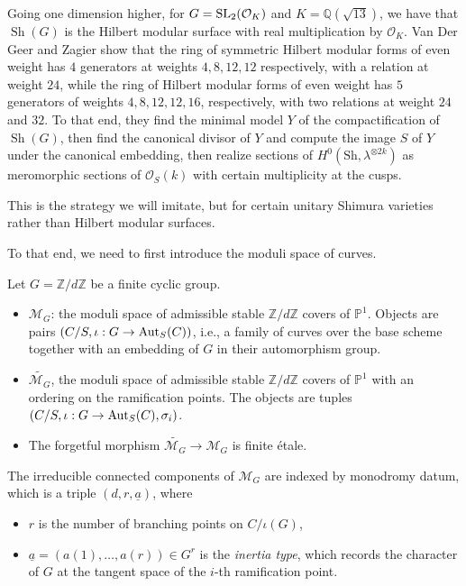 \documentclass[reqno]{amsart} 
\begin{document}
Going one dimension higher, for $G = \operatorname{SL}_2(\mathcal{O}_K)$ and $K = \mathbb{Q}(\sqrt{13})$, we have that $\operatorname{Sh}(G)$ is the Hilbert modular surface with real multiplication by $\mathcal{O}_K$.  Van Der Geer and Zagier show that the ring of symmetric Hilbert modular forms of even weight has $4$ generators at weights $4, 8, 12, 12$ respectively, with a relation at weight $24$, while the ring of Hilbert modular forms of even weight has $5$ generators of weights $4, 8, 12, 12, 16$, respectively, with two relations at weight $24$ and $32$.  To that end, they find the minimal model $Y$ of the compactification of $\operatorname{Sh}(G)$, then find the canonical divisor of $Y$ and compute the image $S$ of $Y$ under the canonical embedding, then realize sections of $H^0(\mathrm{Sh}, \lambda^{\otimes 2 k})$ as meromorphic sections of $\mathcal{O}_S(k)$ with certain multiplicity at the cusps.

This is the strategy we will imitate, but for certain unitary Shimura varieties rather than Hilbert modular surfaces.

To that end, we need to first introduce the moduli space of curves.

Let $G = \mathbb{Z} / d \mathbb{Z}$ be a finite cyclic group.
\begin{definition}
  \begin{itemize}
  \item $\mathcal{M}_G$: the moduli space of admissible stable $\mathbb{Z} / d \mathbb{Z}$ covers of $\mathbb{P}^1$.  Objects are pairs $(C / S, \iota : G \rightarrow \operatorname{Aut}_S(C))$, i.e., a family of curves over the base scheme together with an embedding of $G$ in their automorphism group.
  \item $\tilde{\mathcal{M}_G}$, the moduli space of admissible stable $\mathbb{Z} / d \mathbb{Z}$ covers of $\mathbb{P}^1$ with an ordering on the ramification points.  The objects are tuples $(C / S, \iota : G \rightarrow \operatorname{Aut}_S(C), \sigma_i)$.
  \item The forgetful morphism $\tilde{\mathcal{M}_G} \rightarrow \mathcal{M}_G$ is finite {\'e}tale.
  \end{itemize}
\end{definition}
The irreducible connected components of $\mathcal{M}_G$ are indexed by monodromy datum, which is a triple $(d, r, \underline{a})$, where
\begin{itemize}
\item $r$ is the number of branching points on $C / \iota(G)$,
\item $\underline{a} =(a(1), \dotsc, a(r)) \in G^r$ is the \emph{inertia type}, which records the character of $G$ at the tangent space of the $i$-th ramification point.
\end{itemize}
\end{document}

